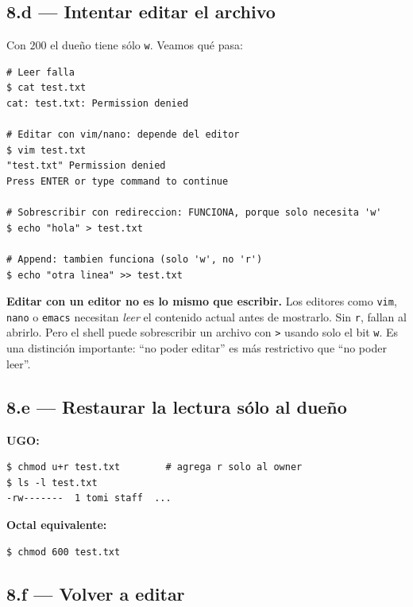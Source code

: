 \documentclass[11pt,a4paper]{article}
\begin{document}
\subsection*{8.d --- Intentar editar el archivo}

Con $200$ el dueño tiene sólo \texttt{w}. Veamos qué pasa:

\begin{lstlisting}[style=shellstyle]
# Leer falla
$ cat test.txt
cat: test.txt: Permission denied

# Editar con vim/nano: depende del editor
$ vim test.txt
"test.txt" Permission denied
Press ENTER or type command to continue

# Sobrescribir con redireccion: FUNCIONA, porque solo necesita 'w'
$ echo "hola" > test.txt

# Append: tambien funciona (solo 'w', no 'r')
$ echo "otra linea" >> test.txt
\end{lstlisting}

\begin{importante}
\textbf{Editar con un editor no es lo mismo que escribir.} Los
editores como \texttt{vim}, \texttt{nano} o \texttt{emacs} necesitan
\emph{leer} el contenido actual antes de mostrarlo. Sin \texttt{r},
fallan al abrirlo. Pero el shell puede sobrescribir un archivo con
\texttt{>} usando solo el bit \texttt{w}. Es una distinción importante:
``no poder editar'' es más restrictivo que ``no poder leer''.
\end{importante}

\subsection*{8.e --- Restaurar la lectura sólo al dueño}

\textbf{UGO:}

\begin{lstlisting}[style=shellstyle]
$ chmod u+r test.txt        # agrega r solo al owner
$ ls -l test.txt
-rw-------  1 tomi staff  ...
\end{lstlisting}

\textbf{Octal equivalente:}

\begin{lstlisting}[style=shellstyle]
$ chmod 600 test.txt
\end{lstlisting}

\subsection*{8.f --- Volver a editar}
\end{document}
